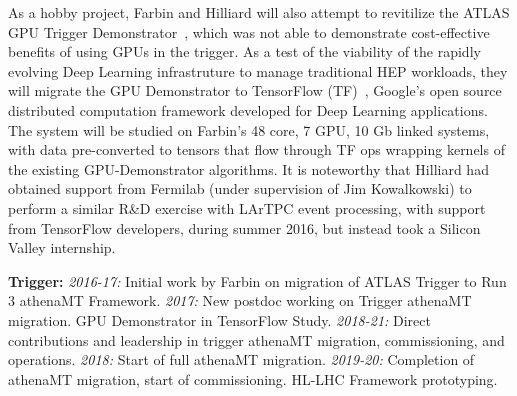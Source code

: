 
As a hobby project, Farbin and Hilliard will also attempt to
revitilize the ATLAS GPU Trigger
Demonstrator~\cite{TavaresDelgado:2104313}, which was not able to
demonstrate cost-effective benefits of using GPUs in the trigger. As a
test of the viability of the rapidly evolving Deep Learning
infrastruture to manage traditional HEP workloads, they will migrate
the GPU Demonstrator to TensorFlow
(TF)~\cite{tensorflow2015-whitepaper}, Google's open source
distributed computation framework developed for Deep Learning
applications. The system will be studied on Farbin's 48 core, 7 GPU,
10 Gb linked systems, with data pre-converted to tensors that flow
through TF ops wrapping kernels of the existing GPU-Demonstrator
algorithms. It is noteworthy that Hilliard had obtained support from
Fermilab (under supervision of Jim Kowalkowski) to perform a similar
R\&D exercise with LArTPC event processing, with support from
TensorFlow developers, during summer 2016, but instead took a Silicon
Valley internship.

{\bf Trigger:} {\em 2016-17:} Initial work by Farbin on migration of
ATLAS Trigger to Run 3 athenaMT Framework.  {\em 2017:} New postdoc
working on Trigger athenaMT migration. GPU Demonstrator in TensorFlow
Study.  {\em 2018-21:} Direct contributions and leadership in trigger
athenaMT migration, commissioning, and operations.  {\em 2018:} Start
of full athenaMT migration. {\em 2019-20:} Completion of athenaMT
migration, start of commissioning. HL-LHC Framework prototyping.





